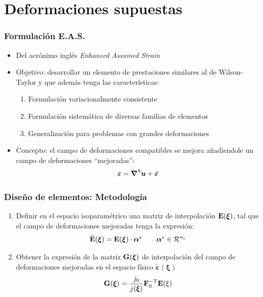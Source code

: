 \documentclass[handout]{beamer}
\begin{document}
\section{Deformaciones supuestas}
\begin{frame}
\frametitle{Formulación E.A.S.}
\begin{itemize}
\item Del acrónimo inglés {\em Enhanced Assumed Strain}
\item Objetivo: desarrollar un 
elemento de prestaciones similares al de
Wilson-Taylor y que además tenga las características:
\begin{enumerate}
\item Formulación variacionalmente consistente
\item Formulación sistemática de diversas familias de elementos
\item Generalización para problemas con grandes deformaciones
\end{enumerate}
\item Concepto: el campo de deformaciones compatibles se mejora 
añadiendole un campo de deformaciones ``mejoradas'':
$$\bm{\varepsilon}=\bm{\nabla}^{\rm S}\bm{u}+\tilde{\bm{\varepsilon}}$$
\end{itemize}
\end{frame}
\begin{frame}
\frametitle{Diseño de elementos: Metodología}
\begin{enumerate}
\item Definir en el espacio isoparamétrico una matriz de interpolación 
${\bf E}({\bm \xi})$, tal que el campo de deformaciones mejoradas tenga 
la expresión:
$$
{\tilde {\bf E}}({\bm \xi})={\bf E}({\bm \xi})\cdot {\bm \alpha}^{e}
\qquad {\bm \alpha}^{e} \in {\cal R}^{n_{\varepsilon}}
$$
\item Obtener la expresión de la matriz ${\bf G}({\bm \xi})$ de interpolación
del campo de deformaciones mejoradas en el espacio físico
${\tilde {\bm \varepsilon}}({\bm \xi})$
$$
{\bf G}({\bm \xi})=\frac{j_{0}}{j({\bm \xi})}{\bf F}_{0}^{-{\rm T}}
{\bf E}({\bf \xi}) 
$$
\end{enumerate}
\end{frame}
\end{document}
